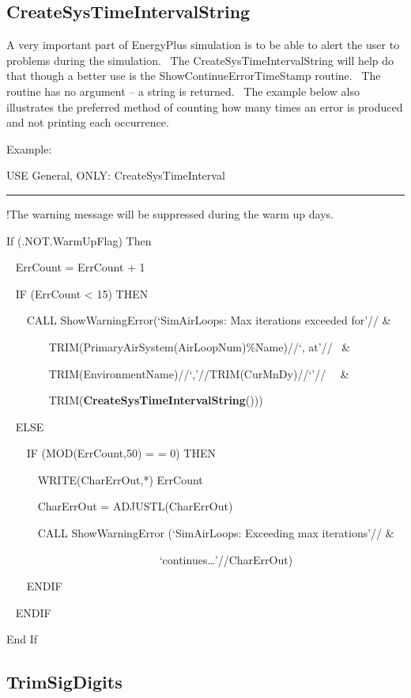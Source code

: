 \subsection{CreateSysTimeIntervalString}\label{createsystimeintervalstring}

A very important part of EnergyPlus simulation is to be able to alert the user to problems during the simulation.~ The CreateSysTimeIntervalString will help do that though a better use is the ShowContinueErrorTimeStamp routine.~ The routine has no argument -- a string is returned.~ The example below also illustrates the preferred method of counting how many times an error is produced and not printing each occurrence.

Example:

USE General, ONLY: CreateSysTimeInterval

\begin{center}\rule{0.5\linewidth}{0.4pt}\end{center}

!The warning message will be suppressed during the warm up days.

If (.NOT.WarmUpFlag) Then

~ ErrCount = ErrCount + 1

~ IF (ErrCount \textless{} 15) THEN

~~~ CALL ShowWarningError(`SimAirLoops: Max iterations exceeded for'// \&

~~~~~~~ TRIM(PrimaryAirSystem(AirLoopNum)\%Name)//`, at'//~ \&

~~~~~~~ TRIM(EnvironmentName)//`,'//TRIM(CurMnDy)//`'//~~ \&

~~~~~~~ TRIM(\textbf{CreateSysTimeIntervalString}()))

~ ELSE

~~~ IF (MOD(ErrCount,50) = = 0) THEN

~~~~~ WRITE(CharErrOut,*) ErrCount

~~~~~ CharErrOut = ADJUSTL(CharErrOut)

~~~~~ CALL ShowWarningError (`SimAirLoops: Exceeding max iterations'// \&

~~~~~~~~~~~~~~~~~~~~~~~~~~~ `continues\ldots{}'//CharErrOut)

~~~ ENDIF

~ ENDIF

End If

\subsection{TrimSigDigits}\label{trimsigdigits}

